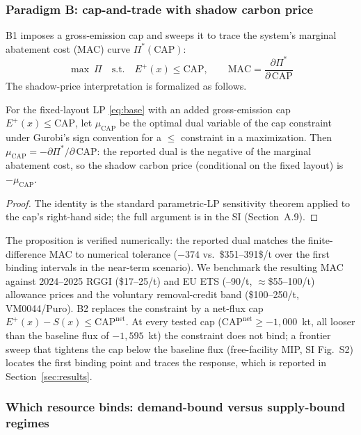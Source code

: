 \subsubsection{Paradigm B: cap-and-trade with shadow carbon price}

B1 imposes a gross-emission cap and sweeps it to trace the system's marginal
abatement cost (MAC) curve $\Pi^{*}(\mathrm{CAP})$:
\begin{equation}
\max\ \Pi \quad \text{s.t.}\quad E^{+}(x)\le \mathrm{CAP},
\qquad \mathrm{MAC}=\frac{\partial \Pi^{*}}{\partial\,\mathrm{CAP}}
\end{equation}
The shadow-price interpretation is formalized as follows.
\begin{proposition}
\label{prop:mac_dual}
For the fixed-layout LP \eqref{eq:base} with an added gross-emission cap
$E^{+}(x)\le\mathrm{CAP}$, let $\mu_{\mathrm{CAP}}$ be the optimal dual
variable of the cap constraint under Gurobi's sign convention for a $\le$
constraint in a maximization. Then
$\mu_{\mathrm{CAP}}=-\partial\Pi^{*}/\partial\,\mathrm{CAP}$: the reported dual
is the negative of the marginal abatement cost, so the shadow carbon price
(conditional on the fixed layout) is $-\mu_{\mathrm{CAP}}$.
\end{proposition}
\begin{proof}
The identity is the standard parametric-LP sensitivity theorem applied to the
cap's right-hand side; the full argument is in the SI (Section~A.9).
\end{proof}
The proposition is verified numerically: the reported dual matches the
finite-difference MAC to numerical tolerance ($-374$ vs.\ \$351--391\$/t over
the first binding intervals in the near-term scenario). We benchmark the
resulting MAC against 2024--2025 RGGI
(\$17--25/t) and EU ETS (--90/t, $\approx$\$55--100/t) allowance
prices and the
voluntary removal-credit band (\$100--250/t, VM0044/Puro). B2 replaces the
constraint by a net-flux cap
$E^{+}(x)-S(x)\le\mathrm{CAP}^{\mathrm{net}}$. At every tested cap
($\mathrm{CAP}^{\mathrm{net}}\ge-1{,}000$~kt, all looser than the baseline
flux of $-1{,}595$~kt) the constraint does not bind; a frontier sweep that
tightens the cap below the baseline flux (free-facility MIP, SI Fig.~S2)
locates the first binding point and traces the response, which is reported in
Section~\ref{sec:results}.

\subsubsection{Which resource binds: demand-bound versus supply-bound regimes}

